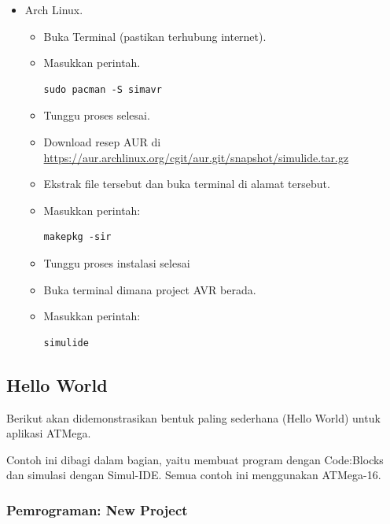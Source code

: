 \documentclass[12pt,]{article}
\begin{document}
\begin{itemize}
		\item Arch Linux.
		\begin{itemize}
			\item Buka Terminal (pastikan terhubung internet).
			\item Masukkan perintah.
			\begin{verbatim}
sudo pacman -S simavr
			\end{verbatim}
			\item Tunggu proses selesai.
			\item Download resep AUR di \url{https://aur.archlinux.org/cgit/aur.git/snapshot/simulide.tar.gz}
			\item Ekstrak file tersebut dan buka terminal di alamat tersebut.
			\item Masukkan perintah:
			\begin{verbatim}
makepkg -sir
			\end{verbatim}
			\item Tunggu proses instalasi selesai
			\item Buka terminal dimana project AVR berada.
			\item Masukkan perintah:
			\begin{verbatim}
simulide
			\end{verbatim}
		\end{itemize}
		
	\end{itemize}

	\newpage
	\subsection{Hello World}
	
	Berikut akan didemonstrasikan bentuk paling sederhana (Hello World) untuk aplikasi ATMega.
	
	Contoh ini dibagi dalam bagian, yaitu membuat program dengan Code:Blocks dan simulasi dengan Simul-IDE.
	Semua contoh ini menggunakan ATMega-16.
	
	\subsubsection{Pemrograman: New Project}
	
\end{document}
